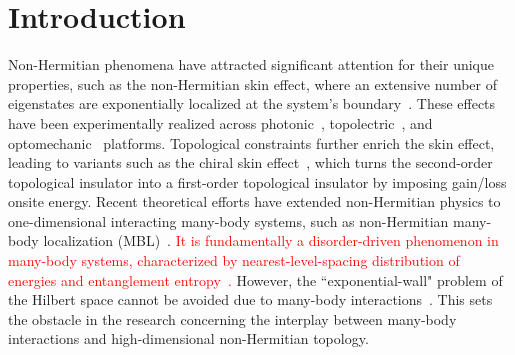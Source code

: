 \documentclass[longbibliography, aps, prx, amsmath, amssymb, amsfonts, twocolumn,superscriptaddress, footinbib]{revtex4-1}
\begin{document}
	\section{Introduction}
	Non-Hermitian phenomena have attracted significant attention for their unique properties, such as the non-Hermitian skin effect, where an extensive number of eigenstates are exponentially localized at the system's boundary~\cite{RN1166,RN1168,gong2018topological,kawabata2019symmetry,RN1212,RN1214,RN1217,RN1160}. 
	These effects have been experimentally realized across photonic~\cite{RN1165,RN1167,RN1227,nie2023non}, topolectric~\cite{zou2021observation,RN2,RN1225}, and optomechanic~\cite{RN632,RN1226} platforms. Topological constraints further enrich the skin effect, leading to variants such as the chiral skin effect~\cite{nakamura2023universal,ma2024non,schindler2023hermitian,lee2019hybrid,RN1221}, which turns the second-order topological insulator into a first-order topological insulator by imposing gain/loss onsite energy. 
	Recent theoretical efforts have extended non-Hermitian physics to one-dimensional interacting many-body systems, such as non-Hermitian many-body localization (MBL)~\cite{mak2024statics,hamazaki2019non}. 
	\textcolor{red}{
		It is fundamentally a disorder-driven phenomenon in many-body systems, characterized by nearest-level-spacing distribution of energies and entanglement entropy~\cite{abanin2019colloquium,alet2018many,mak2024statics,hamazaki2019non}.
	}
	However, the ``exponential-wall" problem of the Hilbert space cannot be avoided due to many-body interactions~\cite{Kohn1999}. This sets the obstacle in the research concerning the interplay between many-body interactions and high-dimensional non-Hermitian topology.
    
\end{document}
